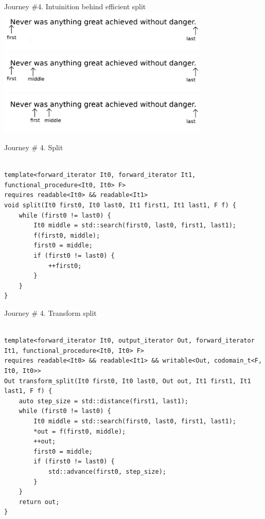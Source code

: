 \documentclass[10pt]{beamer}
\begin{document}
\begin{frame}{Journey \#4. Intuinition behind efficient split}
    \includegraphics[height=2cm]{images/split-1.png}
    \includegraphics[height=2cm]{images/split-2.png}
    \includegraphics[height=2cm]{images/split-3.png}
\end{frame}


\begin{frame}[fragile]{Journey \# 4. Split}
\begin{lstlisting}[style=cpp]

template<forward_iterator It0, forward_iterator It1, functional_procedure<It0, It0> F>
requires readable<It0> && readable<It1>
void split(It0 first0, It0 last0, It1 first1, It1 last1, F f) {
    while (first0 != last0) {
        It0 middle = std::search(first0, last0, first1, last1);
        f(first0, middle);
        first0 = middle;
        if (first0 != last0) {
            ++first0;
        }
    }
}

\end{lstlisting}
\end{frame}


\begin{frame}[fragile]{Journey \# 4. Transform split}
\begin{lstlisting}[style=cpp]%%%%%%%

template<forward_iterator It0, output_iterator Out, forward_iterator It1, functional_procedure<It0, It0> F>
requires readable<It0> && readable<It1> && writable<Out, codomain_t<F, It0, It0>>
Out transform_split(It0 first0, It0 last0, Out out, It1 first1, It1 last1, F f) {
    auto step_size = std::distance(first1, last1);
    while (first0 != last0) {
        It0 middle = std::search(first0, last0, first1, last1);
        *out = f(first0, middle);
        ++out;
        first0 = middle;
        if (first0 != last0) {
            std::advance(first0, step_size);
        }
    }
    return out;
}

\end{lstlisting}
\end{frame}
\end{document}
